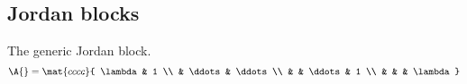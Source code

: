 \subsection{Jordan blocks}

The generic Jordan block.
\begin{equation}
  \A{} =
  \mat{cccc}{
  \lambda & 1  \\
    & \ddots & \ddots \\
    & & \ddots & 1 \\
    & & &  \lambda
   }
\end{equation}







\endinput